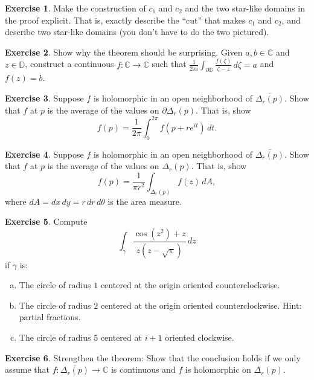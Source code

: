 \documentclass[12pt,openany]{book}
\newcommand{\C}{{\mathbb{C}}}
\newcommand{\D}{{\mathbb{D}}}
\newcommand{\myquote}[1]{``#1''}
\theoremstyle{plain}
\theoremstyle{remark}
\theoremstyle{definition}
\newenvironment{exbox}{%
    \def\FrameCommand{\vrule width 1pt \relax\hspace{10pt}}%
    \MakeFramed{\advance\hsize-\width\FrameRestore}%
}{%
    \endMakeFramed
}
\newenvironment{exparts}{%
    \leavevmode\begin{enumerate}[a),noitemsep,topsep=0pt,parsep=0pt,partopsep=0pt]
}{%
    \end{enumerate}
}
\theoremstyle{exercise}
\newtheorem{exercise}{Exercise}[section]
\theoremstyle{example}
\begin{document}
\begin{exbox}
\begin{exercise}
Make the construction of $c_1$ and $c_2$ and the two star-like domains
in the proof explicit.  That is, exactly describe the \myquote{cut} that makes
$c_1$ and $c_2$, and describe two star-like domains (you don't have to do the
two pictured).
\end{exercise}

\begin{exercise}
Show why the theorem should be surprising.  Given $a,b \in \C$ and $z \in \D$,
construct a continuous 
$f \colon \C \to \C$ such that $\frac{1}{2\pi i}\int_{\partial \D}
\frac{f(\zeta)}{\zeta -z} \, d\zeta = a$ and $f(z) = b$.
\end{exercise}

\begin{exercise}
Suppose $f$ is holomorphic in an open neighborhood of $\overline{\Delta_r(p)}$.
Show that $f$ at $p$ is the average of the values on $\partial \Delta_r(p)$.
That is, show
\begin{equation*}
f(p) = \frac{1}{2\pi} \int_0^{2\pi} f(p + r e^{it}) \, dt .
\end{equation*}
\end{exercise}

\begin{exercise}
Suppose $f$ is holomorphic in an open neighborhood of $\overline{\Delta_r(p)}$.
Show that $f$ at $p$ is the average of the values on $\Delta_r(p)$.
That is, show
\begin{equation*}
f(p) = \frac{1}{\pi r^2} \int_{\Delta_r(p)} f(z) \, dA ,
\end{equation*}
%
where $dA = dx \, dy = r \, dr \, d\theta$ is the area measure.
\end{exercise}

\begin{exercise}
Compute 
\begin{equation*}
\int_\gamma \frac{\cos ( z^2 ) +z}{z(z-\sqrt{\pi})} \, dz
\end{equation*}
if $\gamma$ is:
\begin{exparts}
\item
The circle of radius $1$ centered at the origin oriented
counterclockwise.
\item
The circle of radius $2$ centered at the origin oriented
counterclockwise.  Hint: partial fractions.
\item
The circle of radius 5 centered at $i+1$ oriented clockwise.
\end{exparts}
\end{exercise}

\begin{exercise} \label{exercise:strongerCIFdisc}
Strengthen the theorem:  Show that the conclusion holds if
we only assume that $f \colon \overline{\Delta_r(p)} \to \C$
is continuous and $f$ is holomorphic on $\Delta_r(p)$.
\end{exercise}
\end{exbox}
\end{document}
